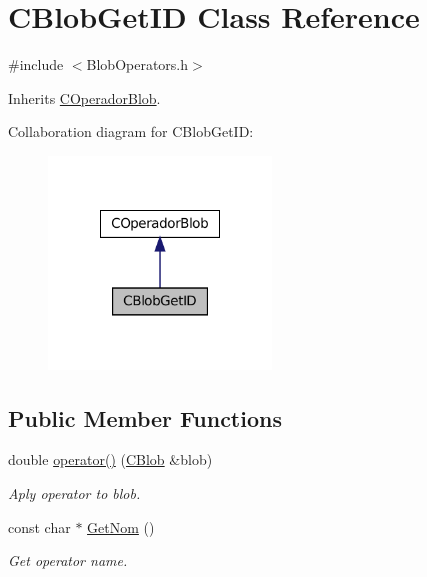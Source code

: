 \hypertarget{class_c_blob_get_i_d}{
\section{CBlobGetID Class Reference}
\label{class_c_blob_get_i_d}
}


{\ttfamily \#include $<$BlobOperators.h$>$}



Inherits \hyperlink{class_c_operador_blob}{COperadorBlob}.



Collaboration diagram for CBlobGetID:
\nopagebreak
\begin{figure}[H]
\begin{center}
\leavevmode
\includegraphics[width=168pt]{class_c_blob_get_i_d__coll__graph}
\end{center}
\end{figure}
\subsection*{Public Member Functions}
\begin{DoxyCompactItemize}
\item 
double \hyperlink{class_c_blob_get_i_d_a01557f50837f1e52f3b6c690c0af6592}{operator()} (\hyperlink{class_c_blob}{CBlob} \&blob)
\begin{DoxyCompactList}\small\item\em Aply operator to blob. \item\end{DoxyCompactList}\item 
const char $\ast$ \hyperlink{class_c_blob_get_i_d_a2e8c1e291d6b13bb1ecbbf8964cb9d2f}{GetNom} ()
\begin{DoxyCompactList}\small\item\em Get operator name. \item\end{DoxyCompactList}\end{DoxyCompactItemize}



